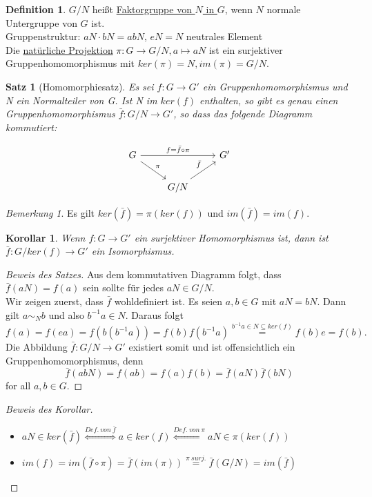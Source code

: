 \documentclass[12pt]{scrartcl}%
\newtheorem{thm}{Satz}
\newtheorem{kor}{Korollar}
\theoremstyle{definition}
\newtheorem*{defn}{Definition}
\theoremstyle{remark}
\newtheorem*{nb}{Bemerkung}
\begin{document}
\begin{defn}
	$G/N$ heißt \underline{Faktorgruppe von $N$ in $G$}, wenn $N$ normale Untergruppe von $G$ ist. \\
	Gruppenstruktur: $aN \cdot bN = abN$, $eN = N$ neutrales Element \\
	Die \underline{natürliche Projektion} $\pi : G \rightarrow G/N, a \mapsto aN$ ist ein surjektiver Gruppenhomomorphismus mit $ker(\pi) = N, im(\pi) = G/N$.
\end{defn}

\begin{thm}[Homomorphiesatz]
	Es sei $f: G \rightarrow G'$ ein Gruppenhomomorphismus und N ein Normalteiler von G. Ist N im $ker(f)$ enthalten, so gibt es genau einen Gruppenhomomorphismus $\bar{f}: G/N \rightarrow G'$, so dass das folgende Diagramm kommutiert:

    \[ \begin{tikzcd}
            G \arrow[rr,"f=\bar f\circ \pi"] \arrow[rd,"\pi"] & & G'  \\
                                             & G/N \arrow[ru,"\bar f"] &
    \end{tikzcd} \]
\end{thm}

\begin{nb}
	Es gilt $ker(\bar{f}) = \pi(ker(f))$ und $im(\bar{f}) = im(f)$. 
\end{nb}

\begin{kor}
	Wenn $f: G \rightarrow G'$ ein surjektiver Homomorphismus ist, dann ist $\bar{f}: G/ker(f) \rightarrow G'$ ein Isomorphismus.
\end{kor}

\begin{proof}[Beweis des Satzes]
	Aus dem kommutativen Diagramm folgt, dass $\bar{f}(aN) = f(a)$ sein sollte für jedes $aN \in G/N$. \\
	Wir zeigen zuerst, dass $\bar{f}$ wohldefiniert ist. Es seien $a, b \in G$ mit $aN = bN$. Dann gilt $a \sim_{N} b$ und also $b^{-1}a \in N$. Daraus folgt
	$$f(a) = f(ea) = f(b(b^{-1}a)) = f(b) f(b^{-1}a) \stackrel{b^{-1}a \in N \subseteq ker(f)}{=} f(b)e = f(b).$$
	Die Abbildung $\bar{f}: G/N \rightarrow G'$ existiert somit und ist offensichtlich ein Gruppenhomomorphismus, denn
	$$\bar{f}(abN) = f(ab) = f(a)f(b) = \bar{f}(aN)\bar{f}(bN)$$ for all $a, b \in G$.
\end{proof}

\begin{proof}[Beweis des Korollar]
	\begin{itemize}
		\item $aN \in ker(\bar{f}) \stackrel{Def. ~ von ~ \bar{f}}{\Leftrightarrow} a \in ker(f)\stackrel{Def. ~ von ~ \pi}{\Leftrightarrow} aN \in \pi(ker(f))$
		\item $im(f) = im(\bar{f} \circ \pi) = \bar{f}(im(\pi)) \stackrel{\pi ~ surj.}{=} \bar{f}(G/N) = im(\bar{f})$
	\end{itemize}
\end{proof}
\end{document}
